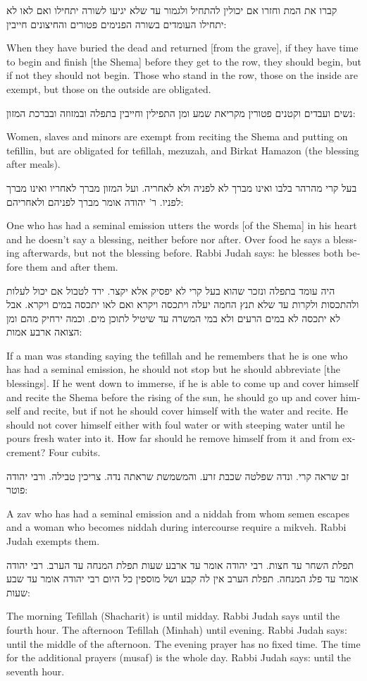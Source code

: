 \documentclass[12pt, openany]{book}
\newcommand{\textblock}[2]{
	{\fontsize{16pt}{20pt}\selectfont #1\\}
	
	\begin{english}
		#2
	\end{english}
	\clearpage
}
\begin{document}
\textblock{קברו את המת וחזרו אם יכולין להתחיל ולגמור עד שלא יגיעו לשורה יתחילו ואם לאו לא יתחילו העומדים בשורה הפנימים פטורים והחיצונים חייבין: }{When they have buried the dead and returned {[from the grave]}, if they have time to begin and finish {[the Shema]} before they get to the row, they should begin, but if not they should not begin. Those who stand in the row, those on the inside are exempt, but those on the outside are obligated.}
\textblock{נשים ועבדים וקטנים פטורין מקריאת שמע ומן התפילין וחייבין בתפלה ובמזוזה ובברכת המזון: }{Women, slaves and minors are exempt from reciting the Shema and putting on tefillin, but are obligated for tefillah, mezuzah, and Birkat Hamazon (the blessing after meals).}
\textblock{בעל קרי מהרהר בלבו ואינו מברך לא לפניה ולא לאחריה. ועל המזון מברך לאחריו ואינו מברך לפניו. ר' יהודה אומר מברך לפניהם ולאחריהם: }{One who has had a seminal emission utters the words {[of the Shema]} in his heart and he doesn’t say a blessing, neither before nor after. Over food he says a blessing afterwards, but not the blessing before. Rabbi Judah says: he blesses both before them and after them.}
\textblock{היה עומד בתפלה ונזכר שהוא בעל קרי לא יפסיק אלא יקצר. ירד לטבול אם יכול לעלות ולהתכסות ולקרות עד שלא תנץ החמה יעלה ויתכסה ויקרא ואם לאו יתכסה במים ויקרא. אבל לא יתכסה לא במים הרעים ולא במי המשרה עד שיטיל לתוכן מים. וכמה ירחיק מהם ומן הצואה ארבע אמות: }{If a man was standing saying the tefillah and he remembers that he is one who has had a seminal emission, he should not stop but he should abbreviate {[the blessings]}. If he went down to immerse, if he is able to come up and cover himself and recite the Shema before the rising of the sun, he should go up and cover himself and recite, but if not he should cover himself with the water and recite. He should not cover himself either with foul water or with steeping water until he pours fresh water into it. How far should he remove himself from it and from excrement? Four cubits.}
\textblock{זב שראה קרי. ונדה שפלטה שכבת זרע. והמשמשת שראתה נדה. צריכין טבילה. ורבי יהודה פוטר: }{A zav who has had a seminal emission and a niddah from whom semen escapes and a woman who becomes niddah during intercourse require a mikveh. Rabbi Judah exempts them.}
\textblock{תפלת השחר עד חצות. רבי יהודה אומר עד ארבע שעות תפלת המנחה עד הערב. רבי יהודה אומר עד פלג המנחה. תפלת הערב אין לה קבע ושל מוספין כל היום רבי יהודה אומר עד שבע שעות: }{The morning Tefillah (Shacharit) is until midday. Rabbi Judah says until the fourth hour. The afternoon Tefillah (Minhah) until evening. Rabbi Judah says: until the middle of the afternoon. The evening prayer has no fixed time. The time for the additional prayers (musaf) is the whole day. Rabbi Judah says:  until the seventh hour.}
\end{document}
